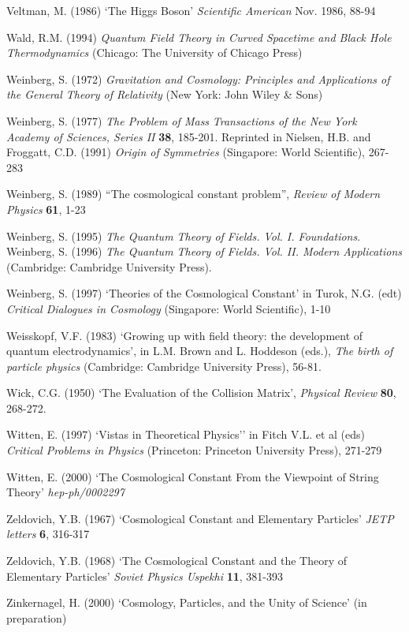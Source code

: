 \documentclass[12pt]{article}
\begin{document}
\begin{thebibliography}{X}
Veltman, M. (1986) `The Higgs Boson' {\em Scientific American}
Nov. 1986, 88-94

 Wald, R.M. (1994) {\em Quantum Field Theory in Curved
Spacetime and Black Hole Thermodynamics}
(Chicago: The University of Chicago Press)

 Weinberg, S. (1972) {\em Gravitation and Cosmology:
Principles and Applications of the General Theory of Relativity}
(New York: John Wiley \& Sons)

 Weinberg, S. (1977) {\em The Problem of Mass}
{\em Transactions of the New York Academy of Sciences, Series  II} {\bf 38},
185-201. Reprinted in Nielsen, H.B. and Froggatt, C.D. (1991) 
{\em Origin of Symmetries} (Singapore: World Scientific), 267-283

Weinberg, S. (1989)
``The cosmological constant problem'',
{\em Review of Modern Physics} {\bf 61}, 1-23

Weinberg, S. (1995) {\em The Quantum Theory of Fields. Vol. I.
Foundations}. Weinberg, S. (1996) {\em The Quantum Theory of Fields. Vol. II.
Modern Applications} (Cambridge: Cambridge University Press).

 Weinberg, S. (1997) `Theories of the Cosmological
Constant' in Turok, N.G. (edt) {\em Critical Dialogues in
Cosmology} (Singapore: World Scientific), 1-10

 Weisskopf, V.F. (1983)
`Growing up with field theory: the
development of quantum electrodynamics', in L.M. Brown and L. Hoddeson
(eds.), {\em
The birth of particle physics}
(Cambridge: Cambridge University Press), 56-81.

 Wick, C.G. (1950) `The Evaluation of the Collision Matrix',
{\em Physical Review} {\bf 80}, 268-272.

 Witten, E. (1997) `Vistas in Theoretical Physics'' in
Fitch V.L. et al (eds) {\em Critical Problems in Physics} 
(Princeton: Princeton University Press), 271-279

 Witten, E. (2000) `The Cosmological Constant
From the Viewpoint of String Theory' {\em hep-ph/0002297}

 Zeldovich, Y.B. (1967) `Cosmological Constant
and Elementary Particles' {\em JETP letters} {\bf 6}, 316-317

Zeldovich, Y.B. (1968) `The Cosmological Constant and the Theory
of Elementary Particles' {\em Soviet Physics Uspekhi} {\bf 11},
381-393

Zinkernagel, H. (2000) `Cosmology, Particles, and the Unity of Science'
(in preparation)

\end{thebibliography}
\end{document}
